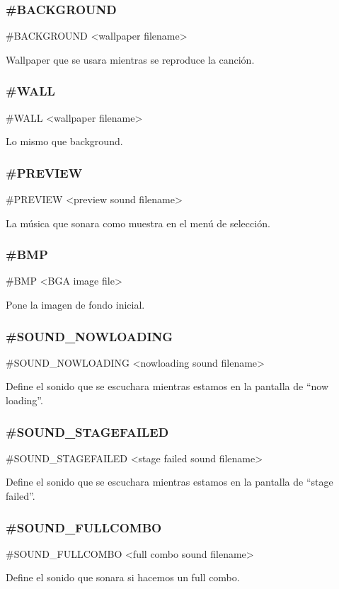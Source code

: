 \documentclass[a4paper,11pt,oneside]{book}
\begin{document}
\subsubsection{\#BACKGROUND}
\#BACKGROUND <wallpaper filename>

Wallpaper que se usara mientras se reproduce la canción.


\subsubsection{\#WALL}

\#WALL <wallpaper filename>

Lo mismo que background.

\subsubsection{\#PREVIEW}
\#PREVIEW <preview sound filename>

La música que sonara como muestra en el menú de selección.


\subsubsection{\#BMP}
\#BMP <BGA image file>

Pone la imagen de fondo inicial.


\subsubsection{\#SOUND\_NOWLOADING}
\#SOUND\_NOWLOADING <nowloading sound filename>

Define el sonido que se escuchara mientras estamos en la pantalla de ``now loading''.


\subsubsection{\#SOUND\_STAGEFAILED}
\#SOUND\_STAGEFAILED <stage failed sound filename>

Define el sonido que se escuchara mientras estamos en la pantalla de ``stage failed''.

\subsubsection{\#SOUND\_FULLCOMBO}
\#SOUND\_FULLCOMBO <full combo sound filename> 

Define el sonido que sonara si hacemos un full combo.
\end{document}
